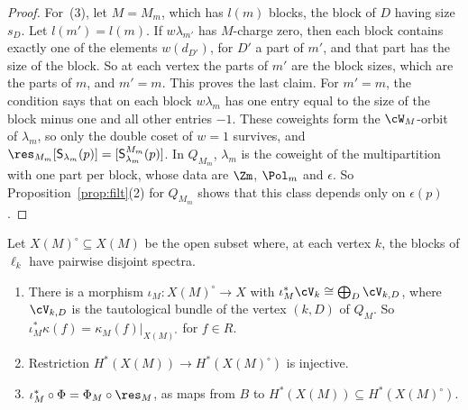 \documentclass[11pt]{amsart}
\begin{document}
\begin{proof}
For~(3), let $M=M_m$, which has $l(m)$ blocks, the block of $D$ having size
$s_D$.  Let $l(m')=l(m)$.  If $w\lambda_{m'}$ has $M$-charge zero, then each
block contains exactly one of the elements $w(d_{D'})$, for $D'$ a part of
$m'$, and that part has the size of the block.  So at each vertex the parts of $m'$ are
the block sizes, which are the parts of $m$, and $m'=m$.  This proves the
last claim.  For $m'=m$, the condition says that on each block $w\lambda_m$
has one entry equal to the size of the block minus one and all other
entries $-1$.  These coweights form the $\cW_{M}$-orbit of $\lambda_m$, so only
the double coset of $w=1$ survives, and
$\res_{M_m}[\mathsf S_{\lambda_m}(p)]=[\mathsf S^{M_m}_{\lambda_m}(p)]$.  In
$Q_{M_m}$, $\lambda_m$ is the coweight of the multipartition with one part per
block, whose data are $\Zm$, $\Pol_m$ and $\epsilon$.  So
Proposition~\ref{prop:filt}(2) for $Q_{M_m}$ shows that this class depends
only on $\epsilon(p)$.
\end{proof}

\begin{lemma}[induction]\label{lem:ind}
Let $X(M)^\circ\subseteq X(M)$ be the open subset where, at each vertex $k$,
the blocks of $\ell_k$ have pairwise disjoint spectra.
\begin{enumerate}[leftmargin=2em]
\item There is a morphism $\iota_M\colon X(M)^\circ\to X$ with
$\iota_M^*\cV_k\cong\bigoplus_D\cV_{k,D}$, where $\cV_{k,D}$ is the tautological
bundle of the vertex $(k,D)$ of $Q_M$.  So
$\iota_M^*\kappa(f)=\kappa_M(f)|_{X(M)^\circ}$ for $f\in R$.
\item Restriction $H^*(X(M))\to H^*(X(M)^\circ)$ is injective.
\item $\iota_M^*\circ\Phi=\Phi_M\circ\res_M$, as maps from $B$ to
$H^*(X(M))\subseteq H^*(X(M)^\circ)$.
\end{enumerate}
\end{lemma}
\end{document}
